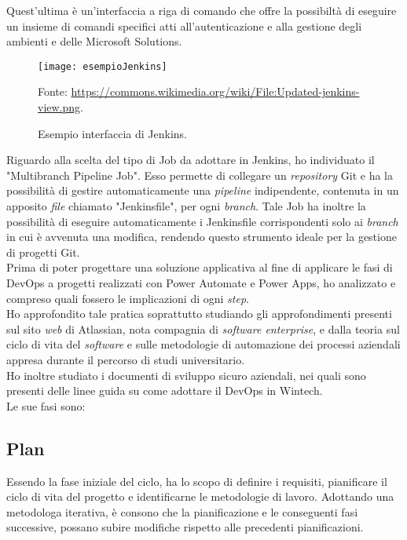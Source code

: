 Quest'ultima è un'interfaccia a riga di comando che offre la possibiltà di eseguire un insieme di comandi specifici atti all'autenticazione e alla gestione degli ambienti e delle Microsoft Solutions.\\
\begin{figure}[htbp] 
    \centering 
    \texttt{[image: esempioJenkins]} 
    \caption{Esempio interfaccia di Jenkins.}
    \label{fig:esempioJenkins}
    \vspace{1mm}
    Fonte: \url{https://commons.wikimedia.org/wiki/File:Updated-jenkins-view.png}.
\end{figure}

Riguardo alla scelta del tipo di Job da adottare in Jenkins, ho individuato il "Multibranch Pipeline Job".
Esso permette di collegare un \emph{repository} Git e ha la possibilità di gestire automaticamente una \emph{pipeline} indipendente, contenuta in un apposito \emph{file} chiamato "Jenkinsfile", per ogni \emph{branch}.
Tale Job ha inoltre la possibilità di eseguire automaticamente i Jenkinsfile corrispondenti solo ai \emph{branch} in cui è avvenuta una modifica, rendendo questo strumento ideale per la gestione di progetti Git.\\




Prima di poter progettare una soluzione applicativa al fine di applicare le fasi di \gls{DevOps} a progetti realizzati con Power Automate e Power Apps, ho analizzato e compreso quali fossero le implicazioni di ogni \emph{step}.\\
Ho approfondito tale pratica soprattutto studiando gli approfondimenti presenti sul sito \emph{web} di Atlassian, nota compagnia di \emph{software enterprise}, e dalla teoria sul ciclo di vita del \emph{software} e sulle metodologie di automazione dei processi aziendali appresa durante il percorso di studi universitario.\\
Ho inoltre studiato i documenti di sviluppo sicuro aziendali, nei quali sono presenti delle linee guida su come adottare il \gls{DevOps} in Wintech.\\
Le sue fasi sono:

\subsection{Plan}
Essendo la fase iniziale del ciclo, ha lo scopo di definire i requisiti, pianificare il ciclo di vita del progetto e identificarne le metodologie di lavoro. Adottando una metodologa iterativa, è consono che la pianificazione e le conseguenti fasi successive, possano subire modifiche rispetto alle precedenti pianificazioni.

